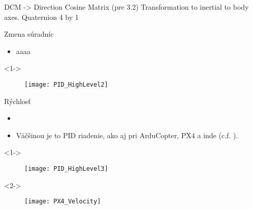 
\begin{frame}
DCM -> Direction Cosine Matrix (pre 3.2)
Transformation to inertial to body axes.
Quaternion 4 by 1
\end{frame}





  \begin{frame}[t]{Zmena súradníc}
\begin{itemize}
  \item<1-> aaaa
\end{itemize}

  \begin{onlyenv}<1->
  \begin{figure}
\centering
  \texttt{[image: PID\_HighLevel2]}\\
\end{figure}
\end{onlyenv}

  \end{frame}



  \begin{frame}[t]{Rýchlosť}
\begin{itemize}
  \item<1->   \item<1-> Väčšinou je to PID riadenie, ako aj pri ArduCopter, PX4 a inde (c.f. \cite{Saha2020}).
\end{itemize}

  \begin{onlyenv}<1->
  \begin{figure}
\centering
  \texttt{[image: PID\_HighLevel3]}\\
\end{figure}
\end{onlyenv}


  \begin{onlyenv}<2->
  \begin{figure}
\centering
  \texttt{[image: PX4\_Velocity]}\\
\end{figure}
\end{onlyenv}

  \end{frame}


